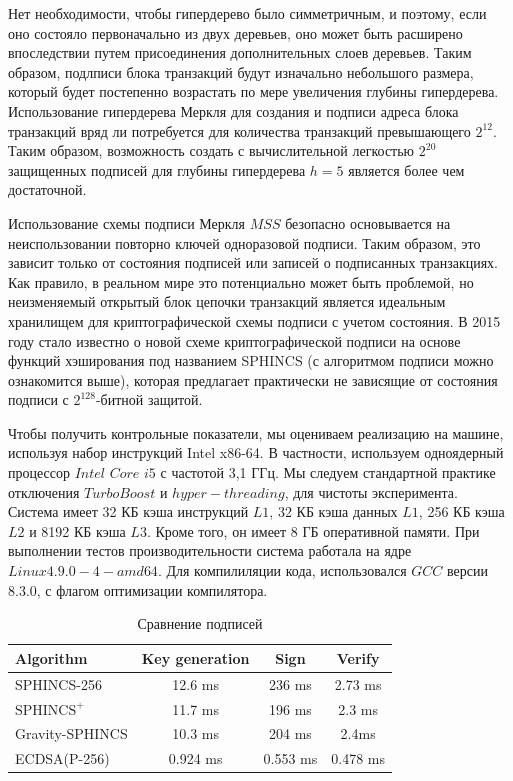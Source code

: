 \documentclass[a4paper, 14pt]{extarticle}
\begin{document}
Нет необходимости, чтобы гипердерево было симметричным, и поэтому, если оно состояло первоначально из двух деревьев, оно может быть расширено впоследствии путем присоединения дополнительных слоев деревьев. Таким образом, подлписи блока транзакций будут изначально небольшого размера, который будет постепенно возрастать по мере увеличения глубины гипердерева. Использование гипердерева Меркля для создания и подписи адреса блока транзакций вряд ли потребуется для количества транзакций превышающего $2^{12}$. Таким образом, возможность создать с вычислительной легкостью $2^{20}$ защищенных подписей для глубины гипердерева $h = 5$ является более чем достаточной.

Использование схемы подписи Меркля $MSS$ безопасно основывается на неиспользовании повторно ключей одноразовой подписи. Таким образом, это зависит только от состояния подписей или записей о подписанных транзакциях. Как правило, в реальном мире это потенциально может быть проблемой, но неизменяемый открытый блок цепочки транзакций является идеальным хранилищем для криптографической схемы подписи с учетом состояния. В 2015 году стало известно о новой схеме криптографической подписи на основе функций хэширования под названием SPHINCS (с алгоритмом подписи можно ознакомится выше), которая предлагает практически не зависящие от состояния подписи с $2^{128}$-битной защитой.

Чтобы получить контрольные показатели, мы оцениваем реализацию на машине, используя набор инструкций Intel x86-64. В частности, используем одноядерный процессор $Intel$ $Core$ $i5$ с частотой 3,1 ГГц. Мы следуем стандартной практике отключения $TurboBoost$ и $hyper-threading$, для чистоты эксперимента. Система имеет 32 КБ кэша инструкций $L1$, 32 КБ кэша данных $L1$, 256 КБ кэша $L2$ и 8192 КБ кэша $L3$. Кроме того, он имеет 8 ГБ оперативной памяти. При выполнении тестов производительности система работала на ядре $Linux 4.9.0-4-amd64$. Для компилиляции кода, использовался $GCC$ версии 8.3.0, с флагом оптимизации компилятора.
\newline

\begin{table}[h!]
    \begin{center}
      \caption{Сравнение подписей}
      \label{tab:table1}
      \begin{tabular}{l|c|c|c}
        \textbf{Algorithm} & \textbf{Key generation} & \textbf{Sign} & \textbf{Verify}\\
        \hline
        SPHINCS-256 & 12.6 ms & 236 ms & 2.73 ms\\
        $\text{SPHINCS}^+$ & 11.7 ms & 196 ms & 2.3 ms\\
        Gravity-SPHINCS & 10.3 ms & 204 ms & 2.4ms\\
        ECDSA(P-256) & 0.924 ms & 0.553 ms & 0.478 ms\\
      \end{tabular}
    \end{center}
  \end{table}
\newpage
\end{document}

